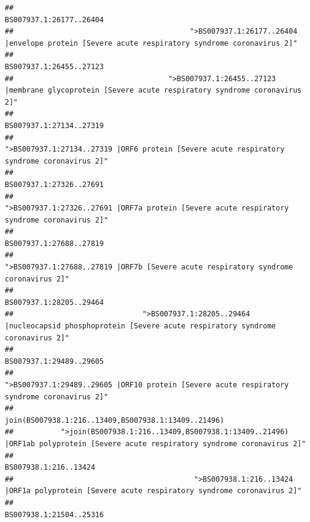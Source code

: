 \documentclass[
]{article}
\begin{document}
\begin{verbatim}
##                                                                                                                BS007937.1:26177..26404 
##                                         ">BS007937.1:26177..26404 |envelope protein [Severe acute respiratory syndrome coronavirus 2]" 
##                                                                                                                BS007937.1:26455..27123 
##                                    ">BS007937.1:26455..27123 |membrane glycoprotein [Severe acute respiratory syndrome coronavirus 2]" 
##                                                                                                                BS007937.1:27134..27319 
##                                             ">BS007937.1:27134..27319 |ORF6 protein [Severe acute respiratory syndrome coronavirus 2]" 
##                                                                                                                BS007937.1:27326..27691 
##                                            ">BS007937.1:27326..27691 |ORF7a protein [Severe acute respiratory syndrome coronavirus 2]" 
##                                                                                                                BS007937.1:27688..27819 
##                                                    ">BS007937.1:27688..27819 |ORF7b [Severe acute respiratory syndrome coronavirus 2]" 
##                                                                                                                BS007937.1:28205..29464 
##                              ">BS007937.1:28205..29464 |nucleocapsid phosphoprotein [Severe acute respiratory syndrome coronavirus 2]" 
##                                                                                                                BS007937.1:29489..29605 
##                                            ">BS007937.1:29489..29605 |ORF10 protein [Severe acute respiratory syndrome coronavirus 2]" 
##                                                                                    join(BS007938.1:216..13409,BS007938.1:13409..21496) 
##           ">join(BS007938.1:216..13409,BS007938.1:13409..21496) |ORF1ab polyprotein [Severe acute respiratory syndrome coronavirus 2]" 
##                                                                                                                  BS007938.1:216..13424 
##                                          ">BS007938.1:216..13424 |ORF1a polyprotein [Severe acute respiratory syndrome coronavirus 2]" 
##                                                                                                                BS007938.1:21504..25316 

\end{verbatim}
\end{document}
